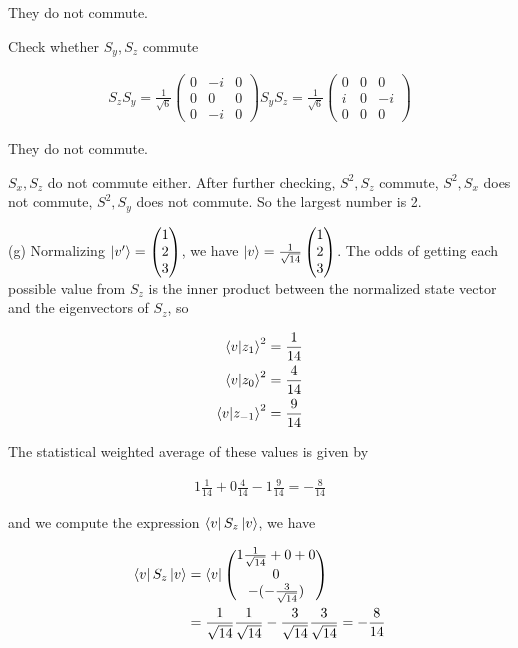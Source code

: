 \documentclass{article}
\begin{document}
They do not commute.

Check whether $S_y, S_z$ commute

\begin{align}
    S_z S_y = \frac{1}{\sqrt{6}}\begin{pmatrix}
        0 & -i & 0 \\ 0 & 0 & 0 \\ 0 & -i & 0
    \end{pmatrix}
    S_y S_z = \frac{1}{\sqrt{6}}\begin{pmatrix}
        0 & 0 & 0 \\ i & 0 & -i \\ 0 & 0 & 0
    \end{pmatrix}
\end{align}

They do not commute.

$S_x, S_z$ do not commute either. After further checking, $S^2, S_z$ commute, $S^2, S_x$ does not commute, $S^2, S_y$ does not commute. So the largest number is 2.

(g) Normalizing $\ket{v'} = \begin{pmatrix}
    1 \\ 2 \\ 3
\end{pmatrix}$, we have $\ket{v} = \frac{1}{\sqrt{14}}\begin{pmatrix}
    1 \\ 2 \\ 3
\end{pmatrix}$. The odds of getting each possible value from $S_z$ is the inner product between the normalized state vector and the eigenvectors of $S_z$, so 

\begin{align}
    \bra{v}\ket{z_1}^2 = \frac{1}{14} \\
    \bra{v}\ket{z_0}^2 = \frac{4}{14} \\
    \bra{v}\ket{z_{-1}}^2 = \frac{9}{14}
\end{align}

The statistical weighted average of these values is given by

\begin{align}
    1 \frac{1}{14} + 0 \frac{4}{14} - 1\frac{9}{14} = -\frac{8}{14}
\end{align}

and we compute the expression $\bra{v}S_z\ket{v}$, we have

\begin{align}
        \bra{v}S_z\ket{v} &= \bra{v}\begin{pmatrix}
            1 \frac{1}{\sqrt{14}} + 0 + 0 \\ 0 \\ -(-\frac{3}{\sqrt{14}})        \end{pmatrix} \\
            &= \frac{1}{\sqrt{14}} \frac{1}{\sqrt{14}} - \frac{3}{\sqrt{14}} \frac{3}{\sqrt{14}} = -\frac{8}{14} 
\end{align}
\end{document}
